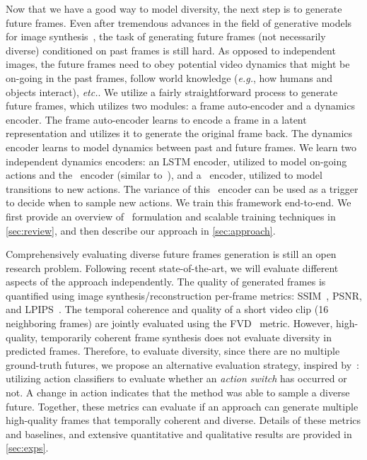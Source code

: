 \documentclass{article} \usepackage{iclr2021_conference,times}
\newcommand{\GP}{}
\def\eg{\emph{e.g.}}
\def\etc{\emph{etc.}}
\begin{document}
Now that we have a good way to model diversity, the next step is to generate future frames. Even after tremendous advances in the field of generative models for image synthesis~\citep{denton2018stochastic,babaeizadeh2017stochastic,lee2018savp,Vondrick2017GeneratingTF,Lu2017FlexibleSN,Vondrick2016GeneratingVW,Saito_2017,Tulyakov_2018,Hu_2019_ICCV}, the task of generating future frames (not necessarily diverse) conditioned on past frames is still hard. As opposed to independent images, the future frames need to obey potential video dynamics that might be on-going in the past frames, follow world knowledge (\eg, how humans and objects interact), \etc.
We utilize a fairly straightforward process to generate future frames, which utilizes two modules: a frame auto-encoder and a dynamics encoder. The frame auto-encoder learns to encode a frame in a latent representation and utilizes it to generate the original frame back. The dynamics encoder learns to model dynamics between past and future frames. We learn two independent dynamics encoders: an LSTM encoder, utilized to model on-going actions and the \GP\ encoder (similar to~\citep{Srivastava:2015:ULV:3045118.3045209}), and a \GP\ encoder, utilized to model transitions to new actions. The variance of this \GP\ encoder can be used as a trigger to decide when to sample new actions. We train this framework end-to-end. We first provide an overview of \GP\ formulation and scalable training techniques in \ref{sec:review}, and then describe our approach in \ref{sec:approach}.

Comprehensively evaluating diverse future frames generation is still an open research problem. Following recent state-of-the-art, we will evaluate different aspects of the approach independently. The quality of generated frames is quantified using image synthesis/reconstruction per-frame metrics: SSIM~\citep{wang2018eidetic,5109651}, PSNR, and LPIPS~\citep{Zhang_2018,dosovitskiy2016generating,Johnson_2016}. The temporal coherence and quality of a short video clip (16 neighboring frames) are jointly evaluated using the FVD~\citep{unterthiner2018accurate} metric. However, high-quality, temporarily coherent frame synthesis does not evaluate diversity in predicted frames. Therefore, to evaluate diversity, since there are no multiple ground-truth futures, we propose an alternative evaluation strategy, inspired by~\citep{villegas2017learning}: utilizing action classifiers to evaluate whether an \emph{action switch} has occurred or not. A change in action indicates that the method was able to sample a diverse future. Together, these metrics can evaluate if an approach can generate multiple high-quality frames that temporally coherent and diverse. Details of these metrics and baselines, and extensive quantitative and qualitative results are provided in \ref{sec:exps}.
\end{document}
